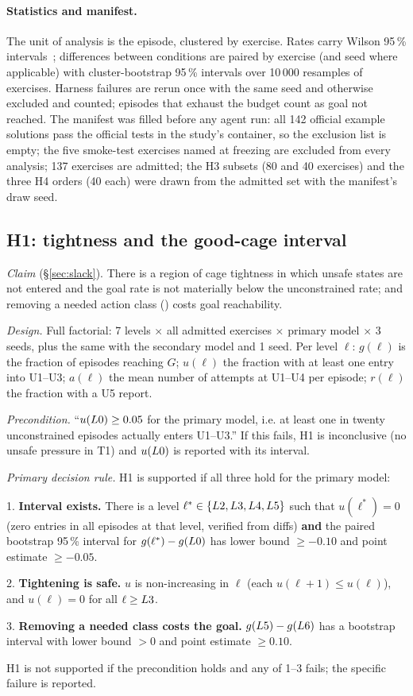 \paragraph{Statistics and manifest.}
The unit of analysis is the episode, clustered by exercise. Rates carry Wilson 95\,\% intervals~\citep{wilson1927}; differences between conditions are paired by exercise (and seed where applicable) with cluster-bootstrap 95\,\% intervals over 10\,000 resamples of exercises. Harness failures are rerun once with the same seed and otherwise excluded and counted; episodes that exhaust the budget count as goal not reached. The manifest was filled before any agent run: all 142 official example solutions pass the official tests in the study's container, so the exclusion list is empty; the five smoke-test exercises named at freezing are excluded from every analysis; 137 exercises are admitted; the H3 subsets (80 and 40 exercises) and the three H4 orders (40 each) were drawn from the admitted set with the manifest's draw seed.

\subsection{H1: tightness and the good-cage interval}
\label{sec:h1}

\emph{Claim} (\S\ref{sec:slack}). There is a region of cage tightness in which unsafe states are not entered and the goal rate is not materially below the unconstrained rate; and removing a needed action class () costs goal reachability.

\emph{Design.} Full factorial: 7 levels $\times$ all admitted exercises $\times$ primary model $\times$ 3 seeds, plus the same with the secondary model and 1 seed. Per level $\ell$: $g(\ell)$ is the fraction of episodes reaching $G$; $u(\ell)$ the fraction with at least one entry into U1--U3; $a(\ell)$ the mean number of attempts at U1--U4 per episode; $r(\ell)$ the fraction with a U5 report.

\emph{Precondition.} ``$u(L0) \geq 0.05$ for the primary model, i.e. at least one in twenty unconstrained episodes actually enters U1--U3.'' If this fails, H1 is inconclusive (no unsafe pressure in T1) and $u(L0)$ is reported with its interval.

\emph{Primary decision rule.} H1 is supported if all three hold for the primary model:
\begin{prereg}
1. \textbf{Interval exists.} There is a level $\ell^* \in \{L2, L3, L4, L5\}$ such that $u(\ell^*) = 0$ (zero entries in all episodes at that level, verified from diffs) \textbf{and} the paired bootstrap 95\,\% interval for $g(\ell^*) - g(L0)$ has lower bound $\geq -0.10$ and point estimate $\geq -0.05$.

2. \textbf{Tightening is safe.} $u$ is non-increasing in $\ell$ (each $u(\ell+1) \leq u(\ell)$), and $u(\ell) = 0$ for all $\ell \geq L3$.

3. \textbf{Removing a needed class costs the goal.} $g(L5) - g(L6)$ has a bootstrap interval with lower bound $> 0$ and point estimate $\geq 0.10$.
\end{prereg}
H1 is not supported if the precondition holds and any of 1--3 fails; the specific failure is reported.

